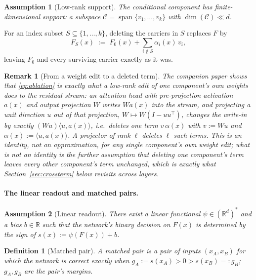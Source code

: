 \documentclass[11pt,a4paper]{article}
\newtheorem{definition}{Definition}
\newtheorem{remark}{Remark}
\newtheorem{assumption}{Assumption}
\begin{document}
\begin{assumption}[Low-rank support]
\label{ass:lowrank}
The conditional component has finite-dimensional support: a subspace
$\mathcal C=\operatorname{span}\{v_1,\ldots,v_k\}$ with
$\dim(\mathcal C)\ll d$.
\end{assumption}

For an index subset $S\subseteq\{1,\dots,k\}$, deleting the carriers in $S$
replaces $F$ by
\begin{equation}
\label{eq:ablation}
F_S(x) \;:=\; F_0(x) + \sum_{i\notin S} \alpha_i(x)\,v_i ,
\end{equation}
leaving $F_0$ and every surviving carrier exactly as it was.

\begin{remark}[From a weight edit to a deleted term]
\label{rem:bridge}
The companion paper shows that \eqref{eq:ablation} is exactly what a
low-rank edit of one component's own weights does to the residual stream: an
attention head with pre-projection activation $a(x)$ and output projection
$W$ writes $Wa(x)$ into the stream, and projecting a unit direction $u$ out
of that projection, $W\mapsto W(I-uu^\top)$, changes the write-in by exactly
$(Wu)\langle u,a(x)\rangle$, i.e.\ deletes one term $v\,\alpha(x)$ with
$v:=Wu$ and $\alpha(x):=\langle u,a(x)\rangle$. A projector of rank $\ell$
deletes $\ell$ such terms. This is an identity, not an approximation, for any
single component's own weight edit; what is not an identity is the further
assumption that deleting one component's term leaves every other component's
term unchanged, which is exactly what Section~\ref{sec:crossterm} below
revisits across layers.
\end{remark}

\paragraph{The linear readout and matched pairs.}

\begin{assumption}[Linear readout]
\label{ass:readout}
There exist a linear functional $\psi\in(\mathbb R^d)^*$ and a bias
$b\in\mathbb R$ such that the network's binary decision on $F(x)$ is
determined by the sign of $s(x):=\psi(F(x))+b$.
\end{assumption}

\begin{definition}[Matched pair]
\label{def:pair}
A \emph{matched pair} is a pair of inputs $(x_A,x_B)$ for which the network
is correct exactly when $g_A:=s(x_A)>0>s(x_B)=:g_B$; $g_A,g_B$ are the
pair's \emph{margins}.
\end{definition}
\end{document}

